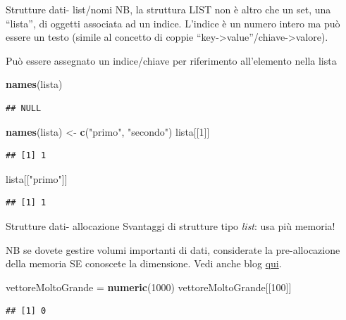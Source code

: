 \documentclass[
  ignorenonframetext,
]{beamer}
\newenvironment{Shaded}{\begin{snugshade}}{\end{snugshade}}
\newcommand{\DecValTok}[1]{\textcolor[rgb]{0.00,0.00,0.81}{#1}}
\newcommand{\FunctionTok}[1]{\textcolor[rgb]{0.13,0.29,0.53}{\textbf{#1}}}
\newcommand{\NormalTok}[1]{#1}
\newcommand{\OtherTok}[1]{\textcolor[rgb]{0.56,0.35,0.01}{#1}}
\newcommand{\StringTok}[1]{\textcolor[rgb]{0.31,0.60,0.02}{#1}}
\begin{document}
\begin{frame}[fragile]{Strutture dati- list/nomi}
\protect\hypertarget{strutture-dati--listnomi}{}
NB, la struttura LIST non è altro che un set, una ``lista'', di oggetti
associata ad un indice. L'indice è un numero intero ma può essere un
testo (simile al concetto di coppie
``key-\textgreater value''/chiave-\textgreater valore).

Può essere assegnato un indice/chiave per riferimento all'elemento nella
lista

\begin{Shaded}
\begin{Highlighting}[]
\FunctionTok{names}\NormalTok{(lista)}
\end{Highlighting}
\end{Shaded}

\begin{verbatim}
## NULL
\end{verbatim}

\begin{Shaded}
\begin{Highlighting}[]
\FunctionTok{names}\NormalTok{(lista) }\OtherTok{\textless{}{-}} \FunctionTok{c}\NormalTok{(}\StringTok{"primo"}\NormalTok{, }\StringTok{"secondo"}\NormalTok{)}
\NormalTok{lista[[}\DecValTok{1}\NormalTok{]]}
\end{Highlighting}
\end{Shaded}

\begin{verbatim}
## [1] 1
\end{verbatim}

\begin{Shaded}
\begin{Highlighting}[]
\NormalTok{lista[[}\StringTok{"primo"}\NormalTok{]]}
\end{Highlighting}
\end{Shaded}

\begin{verbatim}
## [1] 1
\end{verbatim}
\end{frame}

\begin{frame}[fragile]{Strutture dati- allocazione}
\protect\hypertarget{strutture-dati--allocazione}{}
Svantaggi di strutture tipo \emph{list}: usa più memoria!

NB se dovete gestire volumi importanti di dati, considerate la
pre-allocazione della memoria SE conoscete la dimensione. Vedi anche
blog
\href{https://blog.sellorm.com/2019/12/16/vector-pre-allocation-in-r-a-simple-example/}{qui}.

\begin{Shaded}
\begin{Highlighting}[]
\NormalTok{vettoreMoltoGrande }\OtherTok{=} \FunctionTok{numeric}\NormalTok{(}\DecValTok{1000}\NormalTok{)}
\NormalTok{vettoreMoltoGrande[[}\DecValTok{100}\NormalTok{]]}
\end{Highlighting}
\end{Shaded}

\begin{verbatim}
## [1] 0
\end{verbatim}
\end{frame}
\end{document}
